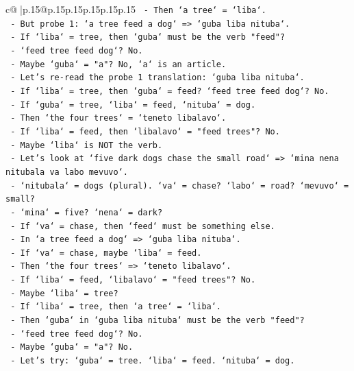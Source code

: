 \documentclass{article}
\begin{document}
{\begin{supertabular}{c@{$\;$}|p{.15\linewidth}@{}p{.15\linewidth}p{.15\linewidth}p{.15\linewidth}p{.15\linewidth}p{.15\linewidth}}
{{{\texttt{  {-} Then `a tree` = `liba`.} \\
\texttt{  {-} But probe 1: `a tree feed a dog` => `guba liba nituba`.} \\
\texttt{  {-} If `liba` = tree, then `guba` must be the verb "feed"?} \\
\texttt{  {-} `feed tree feed dog`? No.} \\
\texttt{  {-} Maybe `guba` = "a"? No, `a` is an article.} \\
\texttt{  {-} Let's re{-}read the probe 1 translation: `guba liba nituba`.} \\
\texttt{  {-} If `liba` = tree, then `guba` = feed? `feed tree feed dog`? No.} \\
\texttt{  {-} If `guba` = tree, `liba` = feed, `nituba` = dog.} \\
\texttt{  {-} Then `the four trees` = `teneto libalavo`.} \\
\texttt{  {-} If `liba` = feed, then `libalavo` = "feed trees"? No.} \\
\texttt{  {-} Maybe `liba` is NOT the verb.} \\
\texttt{  {-} Let's look at `five dark dogs chase the small road` => `mina nena nitubala va labo mevuvo`.} \\
\texttt{  {-} `nitubala` = dogs (plural). `va` = chase? `labo` = road? `mevuvo` = small?} \\
\texttt{  {-} `mina` = five? `nena` = dark?} \\
\texttt{  {-} If `va` = chase, then `feed` must be something else.} \\
\texttt{  {-} In `a tree feed a dog` => `guba liba nituba`.} \\
\texttt{  {-} If `va` = chase, maybe `liba` = feed.} \\
\texttt{  {-} Then `the four trees` => `teneto libalavo`.} \\
\texttt{  {-} If `liba` = feed, `libalavo` = "feed trees"? No.} \\
\texttt{  {-} Maybe `liba` = tree?} \\
\texttt{  {-} If `liba` = tree, then `a tree` = `liba`.} \\
\texttt{  {-} Then `guba` in `guba liba nituba` must be the verb "feed"?} \\
\texttt{  {-} `feed tree feed dog`? No.} \\
\texttt{  {-} Maybe `guba` = "a"? No.} \\
\texttt{  {-} Let's try: `guba` = tree. `liba` = feed. `nituba` = dog.} \\
}}}
\end{supertabular}}
\end{document}

